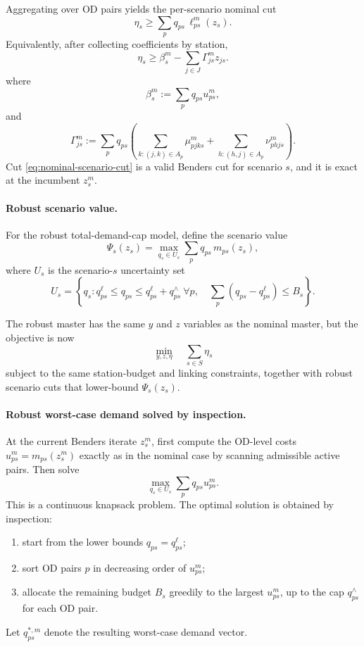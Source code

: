 \documentclass[11pt]{article}
\theoremstyle{definition}
\begin{document}
Aggregating over OD pairs yields the per-scenario nominal cut
\begin{equation}
	\eta_s
	\ge
	\sum_p q_{ps}\,\ell_{ps}^m(z_s).
	\label{eq:nominal-scenario-cut-expanded}
\end{equation}
Equivalently, after collecting coefficients by station,
\begin{equation}
	\eta_s
	\ge
	\beta_s^m
	-
	\sum_{j\in J}\Gamma_{js}^m z_{js}.
	\label{eq:nominal-scenario-cut}
\end{equation}
where
\[
	\beta_s^m := \sum_p q_{ps}u_{ps}^m,
\]
and
\[
	\Gamma_{js}^m
	:=
	\sum_p q_{ps}
	\left(
	\sum_{k:(j,k)\in A_p}\mu_{pjks}^m
	+
	\sum_{h:(h,j)\in A_p}\nu_{phjs}^m
	\right).
\]
Cut \eqref{eq:nominal-scenario-cut} is a valid Benders cut for scenario \(s\),
and it is exact at the incumbent \(z_s^m\).

\paragraph{Robust scenario value.}
For the robust total-demand-cap model, define the scenario value
\begin{equation}
	\Psi_s(z_s)
	=
	\max_{q_s\in U_s}
	\sum_p q_{ps}\,m_{ps}(z_s),
	\label{eq:robust-scenario-value}
\end{equation}
where \(U_s\) is the scenario-\(s\) uncertainty set
\[
	U_s
	=
	\left\{
	q_s:
	q_{ps}^\ell \le q_{ps} \le q_{ps}^\ell + q_{ps}^\wedge\ \forall p,\quad
	\sum_p (q_{ps}-q_{ps}^\ell)\le B_s
	\right\}.
\]

The robust master has the same \(y\) and \(z\) variables as the nominal master,
but the objective is now
\begin{equation}
	\min_{y,z,\eta}\quad \sum_{s\in S}\eta_s
	\label{eq:benders-master-robust-obj}
\end{equation}
subject to the same station-budget and linking constraints, together with
robust scenario cuts that lower-bound \(\Psi_s(z_s)\).

\paragraph{Robust worst-case demand solved by inspection.}
At the current Benders iterate \(z_s^m\), first compute the OD-level costs
\(u_{ps}^m=m_{ps}(z_s^m)\) exactly as in the nominal case by scanning admissible
active pairs. Then solve
\[
	\max_{q_s\in U_s} \sum_p q_{ps}u_{ps}^m.
\]
This is a continuous knapsack problem. The optimal solution is obtained by
inspection:
\begin{enumerate}
	\item start from the lower bounds \(q_{ps}=q_{ps}^\ell\);
	\item sort OD pairs \(p\) in decreasing order of \(u_{ps}^m\);
	\item allocate the remaining budget \(B_s\) greedily to the largest
	      \(u_{ps}^m\), up to the cap \(q_{ps}^\wedge\) for each OD pair.
\end{enumerate}
Let \(q_{ps}^{*,m}\) denote the resulting worst-case demand vector.
\end{document}
